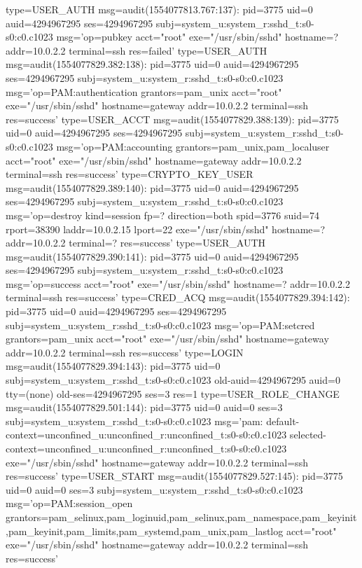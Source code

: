 \documentclass[]{report}
\newenvironment{Shaded}{}{}
\newcommand{\NormalTok}[1]{#1}
\begin{document}
\begin{Shaded}
\begin{Highlighting}[]
\NormalTok{type=USER_AUTH msg=audit(1554077813.767:137): pid=3775 uid=0 auid=4294967295 ses=4294967295 subj=system_u:system_r:sshd_t:s0-s0:c0.c1023 msg='op=pubkey acct="root" exe="/usr/sbin/sshd" hostname=? addr=10.0.2.2 terminal=ssh res=failed'}
\NormalTok{type=USER_AUTH msg=audit(1554077829.382:138): pid=3775 uid=0 auid=4294967295 ses=4294967295 subj=system_u:system_r:sshd_t:s0-s0:c0.c1023 msg='op=PAM:authentication grantors=pam_unix acct="root" exe="/usr/sbin/sshd" hostname=gateway addr=10.0.2.2 terminal=ssh res=success'}
\NormalTok{type=USER_ACCT msg=audit(1554077829.388:139): pid=3775 uid=0 auid=4294967295 ses=4294967295 subj=system_u:system_r:sshd_t:s0-s0:c0.c1023 msg='op=PAM:accounting grantors=pam_unix,pam_localuser acct="root" exe="/usr/sbin/sshd" hostname=gateway addr=10.0.2.2 terminal=ssh res=success'}
\NormalTok{type=CRYPTO_KEY_USER msg=audit(1554077829.389:140): pid=3775 uid=0 auid=4294967295 ses=4294967295 subj=system_u:system_r:sshd_t:s0-s0:c0.c1023 msg='op=destroy kind=session fp=? direction=both spid=3776 suid=74 rport=38390 laddr=10.0.2.15 lport=22  exe="/usr/sbin/sshd" hostname=? addr=10.0.2.2 terminal=? res=success'}
\NormalTok{type=USER_AUTH msg=audit(1554077829.390:141): pid=3775 uid=0 auid=4294967295 ses=4294967295 subj=system_u:system_r:sshd_t:s0-s0:c0.c1023 msg='op=success acct="root" exe="/usr/sbin/sshd" hostname=? addr=10.0.2.2 terminal=ssh res=success'}
\NormalTok{type=CRED_ACQ msg=audit(1554077829.394:142): pid=3775 uid=0 auid=4294967295 ses=4294967295 subj=system_u:system_r:sshd_t:s0-s0:c0.c1023 msg='op=PAM:setcred grantors=pam_unix acct="root" exe="/usr/sbin/sshd" hostname=gateway addr=10.0.2.2 terminal=ssh res=success'}
\NormalTok{type=LOGIN msg=audit(1554077829.394:143): pid=3775 uid=0 subj=system_u:system_r:sshd_t:s0-s0:c0.c1023 old-auid=4294967295 auid=0 tty=(none) old-ses=4294967295 ses=3 res=1}
\NormalTok{type=USER_ROLE_CHANGE msg=audit(1554077829.501:144): pid=3775 uid=0 auid=0 ses=3 subj=system_u:system_r:sshd_t:s0-s0:c0.c1023 msg='pam: default-context=unconfined_u:unconfined_r:unconfined_t:s0-s0:c0.c1023 selected-context=unconfined_u:unconfined_r:unconfined_t:s0-s0:c0.c1023 exe="/usr/sbin/sshd" hostname=gateway addr=10.0.2.2 terminal=ssh res=success'}
\NormalTok{type=USER_START msg=audit(1554077829.527:145): pid=3775 uid=0 auid=0 ses=3 subj=system_u:system_r:sshd_t:s0-s0:c0.c1023 msg='op=PAM:session_open grantors=pam_selinux,pam_loginuid,pam_selinux,pam_namespace,pam_keyinit,pam_keyinit,pam_limits,pam_systemd,pam_unix,pam_lastlog acct="root" exe="/usr/sbin/sshd" hostname=gateway addr=10.0.2.2 terminal=ssh res=success'}

\end{Highlighting}
\end{Shaded}
\end{document}
